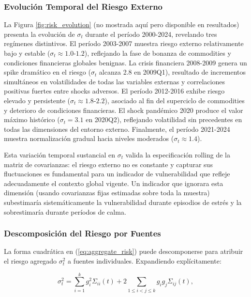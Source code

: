 \documentclass[3p,11pt,draft,natbib=false]{elsarticle}
\begin{document}
\subsubsection{Evolución Temporal del Riesgo Externo}

La Figura \ref{fig:risk_evolution} (no mostrada aquí pero disponible en resultados) presenta la evolución de $\sigma_t$ durante el período 2000-2024, revelando tres regímenes distintivos. El período 2003-2007 muestra riesgo externo relativamente bajo y estable ($\sigma_t \approx 1.0$-$1.2$), reflejando la fase de bonanza de commodities y condiciones financieras globales benignas. La crisis financiera 2008-2009 genera un spike dramático en el riesgo ($\sigma_t$ alcanza 2.8 en 2009Q1), resultado de incrementos simultáneos en volatilidades de todas las variables externas y correlaciones positivas fuertes entre shocks adversos. El período 2012-2016 exhibe riesgo elevado y persistente ($\sigma_t \approx 1.8$-$2.2$), asociado al fin del superciclo de commodities y deterioro de condiciones financieras. El shock pandémico 2020 produce el valor máximo histórico ($\sigma_t = 3.1$ en 2020Q2), reflejando volatilidad sin precedentes en todas las dimensiones del entorno externo. Finalmente, el período 2021-2024 muestra normalización gradual hacia niveles moderados ($\sigma_t \approx 1.4$).

Esta variación temporal sustancial en $\sigma_t$ valida la especificación rolling de la matriz de covarianzas: el riesgo externo no es constante y capturar sus fluctuaciones es fundamental para un indicador de vulnerabilidad que refleje adecuadamente el contexto global vigente. Un indicador que ignorara esta dimensión (usando covarianzas fijas estimadas sobre toda la muestra) subestimaría sistemáticamente la vulnerabilidad durante episodios de estrés y la sobrestimaría durante períodos de calma.

\subsubsection{Descomposición del Riesgo por Fuentes}

La forma cuadrática en (\ref{eq:aggregate_risk}) puede descomponerse para atribuir el riesgo agregado $\sigma_t^2$ a fuentes individuales. Expandiendo explícitamente:

\begin{equation}
\sigma_t^2 = \sum_{i=1}^{k} g_i^2 \Sigma_{ii}(t) + 2\sum_{1 \leq i < j \leq k} g_i g_j \Sigma_{ij}(t),
\label{eq:risk_decomposition}
\end{equation}
\end{document}
